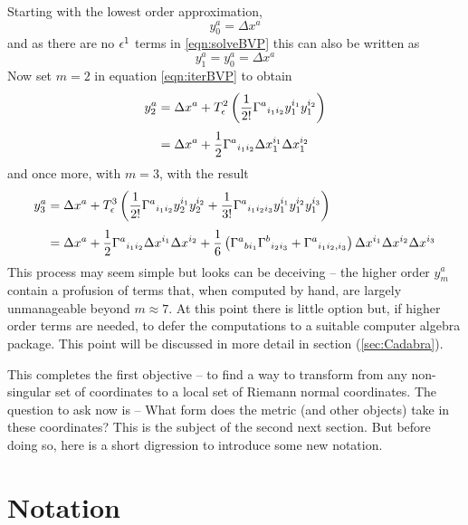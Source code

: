\documentclass[a4paper,12pt]{article}
\numberwithin{equation}{section}
\begin{document}
Starting with the lowest order approximation,
\[
y^a_0 = \Delta x^a
\]
and as there are no $\epsilon^1$ terms in \eqref{eqn:solveBVP} this can also be written as
\[
y^a_1 = y^a_0 = \Delta x^a
\]
Now set $m=2$ in equation \eqref{eqn:iterBVP} to obtain
\begin{align*}
y^a_2 &= \Delta x^a
       + T^2_\epsilon\left(\frac{1}{2!} \Gamma^a{}_{i_1i_2} y^{i_1}_1 y^{i_2}_1\right)\\[3pt]
      &= \Delta x^a + \frac{1}{2} \Gamma^a{}_{i_1i_2} \Delta x^{i_1}_1 \Delta x^{i_2}_1
\end{align*}
and once more, with $m=3$, with the result
\begin{align*}
y^a_3 &= \Delta x^a
       + T^3_\epsilon\left(
             \frac{1}{2!} \Gamma^a{}_{i_1i_2} y^{i_1}_2 y^{i_2}_2
            + \frac{1}{3!} \Gamma^a{}_{i_1i_2i_3} y^{i_1}_1 y^{i_2}_1 y^{i_3}_1\right)\\[3pt]
      &= \Delta x^a + \frac{1}{2} \Gamma^a{}_{i_1i_2} \Delta x^{i_1} \Delta x^{i_2}
                    + \frac{1}{6} \left(  \Gamma^a{}_{bi_1}\Gamma^b{}_{i_2i_3}
                                        + \Gamma^a{}_{i_1i_2,i_3}\right) \Delta x^{i_1}
                                                                         \Delta x^{i_2}
                                                                         \Delta x^{i_3}
\end{align*}
This process may seem simple but looks can be deceiving -- the higher order $y^a_m$ contain
a profusion of terms that, when computed by hand, are largely unmanageable beyond $m\approx
7$. At this point there is little option but, if higher order terms are needed, to defer the
computations to a suitable computer algebra package. This point will be discussed in more
detail in section (\ref{sec:Cadabra}).

This completes the first objective -- to find a way to transform from any non-singular set
of coordinates to a local set of Riemann normal coordinates. The question to ask now is --
What form does the metric (and other objects) take in these coordinates? This is the subject
of the second next section. But before doing so, here is a short digression to introduce
some new notation.

\section{Notation}\label{sec:Notation}
\end{document}
